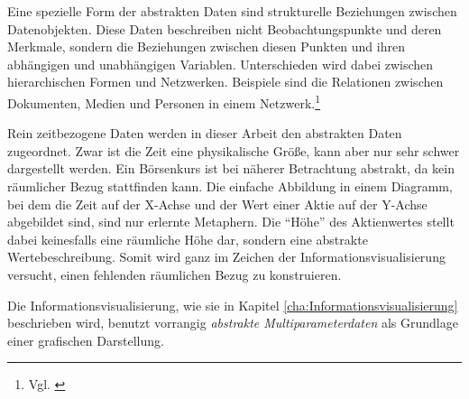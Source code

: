 \documentclass[a4paper, 12pt, DIVcalc, onepage, pdftex, headsepline, footsepline]{scrreprt}
\begin{document}
Eine spezielle Form der abstrakten Daten sind strukturelle Beziehungen zwischen Datenobjekten.
Diese Daten beschreiben nicht Beobachtungspunkte und deren Merkmale, sondern die Beziehungen
zwischen diesen Punkten und ihren abhängigen und unabhängigen Variablen. Unterschieden wird dabei
zwischen hierarchischen Formen und Netzwerken. Beispiele sind die Relationen zwischen Dokumenten,
Medien und Personen in einem Netzwerk.\footnote{Vgl. \citep{Preim}}

Rein zeitbezogene Daten werden in dieser Arbeit den abstrakten Daten zugeordnet. Zwar ist die Zeit eine physikalische
Größe, kann aber nur sehr schwer dargestellt werden. Ein Börsenkurs ist bei näherer Betrachtung
abstrakt, da kein räumlicher Bezug stattfinden kann.
Die einfache Abbildung in einem Diagramm, bei dem die Zeit auf der X-Achse und der Wert einer Aktie auf der Y-Achse
abgebildet sind, sind nur erlernte Metaphern. Die "`Höhe"' des Aktienwertes stellt dabei keinesfalls eine räumliche
Höhe dar, sondern eine abstrakte Wertebeschreibung. Somit wird ganz im Zeichen der Informationsvisualisierung versucht,
einen fehlenden räumlichen Bezug zu konstruieren.

Die Informationsvisualisierung, wie sie in Kapitel \ref{cha:Informationsvisualisierung} beschrieben wird, benutzt
vorrangig \textit{abstrakte Multiparameterdaten} als Grundlage einer grafischen Darstellung.
\end{document}
